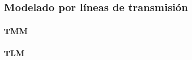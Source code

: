 \subsection{Modelado por líneas de transmisión}
\lipsum

\subsubsection{TMM}
\lipsum[2]
\subsubsection{TLM}
\label{subsubsec_tlm}
\lipsum

